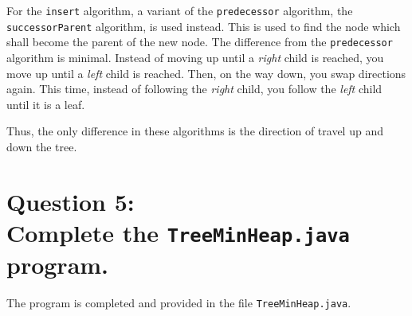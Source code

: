 \documentclass[a4paper, 12pt, titlepage]{article}
\def\code#1{\texttt{#1}}
\begin{document}
For the \code{insert} algorithm,
a variant of the \code{predecessor} algorithm,
 the \code{successorParent} algorithm,
is used instead.
This is used to find the node which shall become the parent of the new node.
The difference from the \code{predecessor} algorithm is minimal.
Instead of moving up until a \textit{right} child is reached,
you move up until a \textit{left} child is reached.
Then,
on the way down,
you swap directions again.
This time,
instead of following the \textit{right} child,
you follow the \textit{left} child until it is a leaf.

Thus,
the only difference in these algorithms is the direction of travel up and down the tree.

\section*{Question 5:\\Complete the \code{TreeMinHeap.java} program.}

The program is completed and provided in the file \code{TreeMinHeap.java}.
\end{document}
